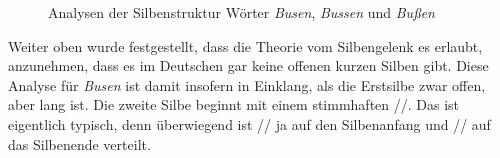 \begin{exe}
  \ex\label{ex:phonschrift4000} 
  \begin{xlist}
  \end{xlist}
\end{exe}

\begin{figure}[h!]
  \centering
  \caption{Analysen der Silbenstruktur Wörter \textit{Busen}, \textit{Bussen} und \textit{Bußen}}
  \label{fig:busen}
\end{figure}

Weiter oben wurde festgestellt, dass die Theorie vom Silbengelenk es erlaubt, anzunehmen, dass es im Deutschen gar keine offenen kurzen Silben gibt.
Diese Analyse für \textit{Busen} ist damit insofern in Einklang, als die Erstsilbe zwar offen, aber lang ist.
Die zweite Silbe \textipa{[z@n]} beginnt mit einem stimmhaften //.
Das ist eigentlich typisch, denn überwiegend ist // ja auf den Silbenanfang und // auf das Silbenende verteilt.

